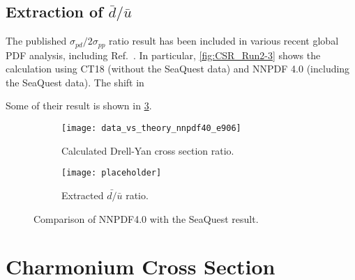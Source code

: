 \documentclass[../main.tex]{subfiles}
\begin{document}
\subsection{Extraction of \texorpdfstring{$\bar{d}/\bar{u}$}{dbar/ubar}}
The published $\sigma_{pd}/2\sigma_{pp}$ ratio result has been included in various recent global 
PDF analysis, including Ref.~\cite{accardi2023,ball2022a,cocuzza2021}. 
In particular, \cref{fig:CSR_Run2-3} shows the calculation using CT18 (without the SeaQuest data) 
and NNPDF 4.0 (including the SeaQuest data). The shift in 

Some of their result is shown in \cref{fig:nnpdf_e906}.

\begin{figure}[htbp!]
	\centering
	\begin{subfigure}{0.45\linewidth}
		\texttt{[image: data\_vs\_theory\_nnpdf40\_e906]}
		\caption{Calculated Drell-Yan cross section ratio.}
		\label{subfig:nnpdf_e906_csr}
	\end{subfigure}
	\begin{subfigure}{0.45\linewidth}
		\texttt{[image: placeholder]}
		\caption{Extracted $\bar{d/}\bar{u}$ ratio.}
		\label{subfig:nnpdf_e906_x2}
	\end{subfigure}
	\caption{Comparison of NNPDF4.0\cite{ball2022a} with the SeaQuest
		result\cite{dove2021}.}
	\label{fig:nnpdf_e906}
\end{figure}


\section{Charmonium Cross Section}
\end{document}
